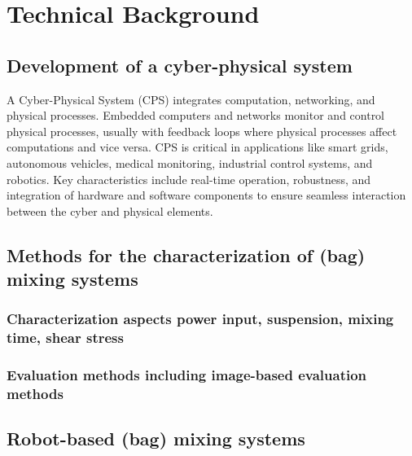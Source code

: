 \chapter{Technical Background}
\section{Development of a cyber-physical system}

A Cyber-Physical System (CPS) integrates computation, networking, and physical processes. Embedded computers and networks monitor and control physical processes, usually with feedback loops where physical processes affect computations and vice versa. CPS is critical in applications like smart grids, autonomous vehicles, medical monitoring, industrial control systems, and robotics. Key characteristics include real-time operation, robustness, and integration of hardware and software components to ensure seamless interaction between the cyber and physical elements.
\autocite{Lee2008}
\section{Methods for the characterization of (bag) mixing systems}
\subsection{Characterization aspects \- power input, suspension, mixing time, shear stress}
\subsection{Evaluation methods \- including image-based evaluation methods}
\section{Robot-based (bag) mixing systems}